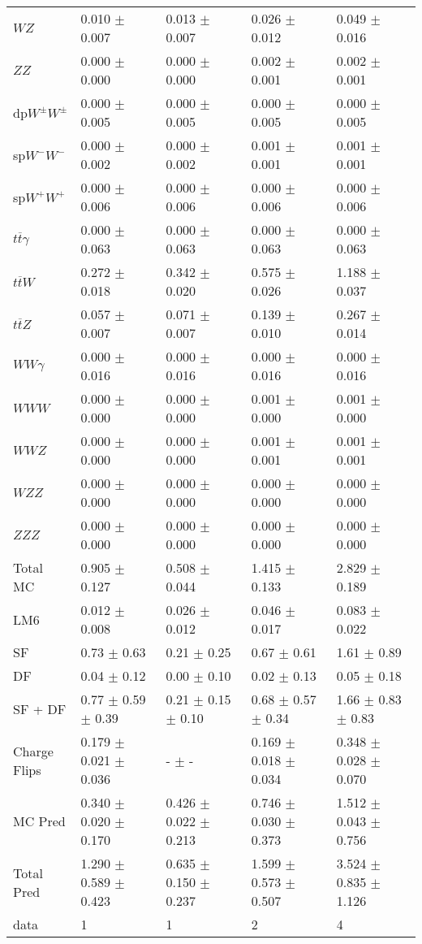 \begin{tabular}{l | l l l l}
$WZ$ &  0.010 $\pm$  0.007 &  0.013 $\pm$  0.007 &  0.026 $\pm$  0.012 &  0.049 $\pm$  0.016\\
$ZZ$ &   0.000 $\pm$   0.000 &   0.000 $\pm$   0.000 &  0.002 $\pm$  0.001 &  0.002 $\pm$  0.001\\
\hline
dp$W^{\pm}W^{\pm}$ &  0.000 $\pm$  0.005 &  0.000 $\pm$  0.005 &  0.000 $\pm$  0.005 &  0.000 $\pm$  0.005\\
sp$W^{-}W^{-}$ &  0.000 $\pm$  0.002 &  0.000 $\pm$  0.002 &  0.001 $\pm$  0.001 &  0.001 $\pm$  0.001\\
sp$W^{+}W^{+}$ &  0.000 $\pm$  0.006 &  0.000 $\pm$  0.006 &  0.000 $\pm$  0.006 &  0.000 $\pm$  0.006\\
$t\overline{t}\gamma$ &  0.000 $\pm$  0.063 &  0.000 $\pm$  0.063 &  0.000 $\pm$  0.063 &  0.000 $\pm$  0.063\\
$t\overline{t}W$ &  0.272 $\pm$  0.018 &  0.342 $\pm$  0.020 &  0.575 $\pm$  0.026 &  1.188 $\pm$  0.037\\
$t\overline{t}Z$ &  0.057 $\pm$  0.007 &  0.071 $\pm$  0.007 &  0.139 $\pm$  0.010 &  0.267 $\pm$  0.014\\
$WW\gamma$ &  0.000 $\pm$  0.016 &  0.000 $\pm$  0.016 &  0.000 $\pm$  0.016 &  0.000 $\pm$  0.016\\
$WWW$ &   0.000 $\pm$   0.000 &   0.000 $\pm$   0.000 &  0.001 $\pm$   0.000 &  0.001 $\pm$   0.000\\
$WWZ$ &  0.000 $\pm$   0.000 &  0.000 $\pm$   0.000 &  0.001 $\pm$  0.001 &  0.001 $\pm$  0.001\\
$WZZ$ &   0.000 $\pm$   0.000 &   0.000 $\pm$   0.000 &  0.000 $\pm$   0.000 &   0.000 $\pm$   0.000\\
$ZZZ$ &   0.000 $\pm$   0.000 &   0.000 $\pm$   0.000 &   0.000 $\pm$   0.000 &   0.000 $\pm$   0.000\\
\hline
Total MC &  0.905 $\pm$  0.127 &  0.508 $\pm$  0.044 &  1.415 $\pm$  0.133 &  2.829 $\pm$  0.189\\
\hline\hline
\hline
LM6 &  0.012 $\pm$  0.008 &  0.026 $\pm$  0.012 &  0.046 $\pm$  0.017 &  0.083 $\pm$  0.022\\
\hline\hline
\hline\hline
 SF  & 0.73 $\pm$ 0.63 & 0.21 $\pm$ 0.25 & 0.67 $\pm$ 0.61 & 1.61 $\pm$ 0.89\\
 DF  & 0.04 $\pm$ 0.12 & 0.00 $\pm$ 0.10 & 0.02 $\pm$ 0.13 & 0.05 $\pm$ 0.18\\
\hline
 SF + DF  & 0.77 $\pm$ 0.59 $\pm$ 0.39 & 0.21 $\pm$ 0.15 $\pm$ 0.10 & 0.68 $\pm$ 0.57 $\pm$ 0.34 & 1.66 $\pm$ 0.83 $\pm$ 0.83\\
\hline\hline
Charge Flips & 0.179 $\pm$ 0.021 $\pm$ 0.036 & - $\pm$ - & 0.169 $\pm$ 0.018 $\pm$ 0.034 & 0.348 $\pm$ 0.028 $\pm$ 0.070\\
\hline\hline
\hline
MC Pred &  0.340 $\pm$  0.020 $\pm$  0.170 &  0.426 $\pm$  0.022 $\pm$  0.213 &  0.746 $\pm$  0.030 $\pm$  0.373 &  1.512 $\pm$  0.043 $\pm$  0.756\\
\hline\hline
Total Pred &  1.290 $\pm$  0.589 $\pm$  0.423 &  0.635 $\pm$  0.150 $\pm$  0.237 &  1.599 $\pm$  0.573 $\pm$  0.507 &  3.524 $\pm$  0.835 $\pm$  1.126\\
\hline\hline
data & 1 & 1 & 2 & 4\\
\hline\hline
\end{tabular}
